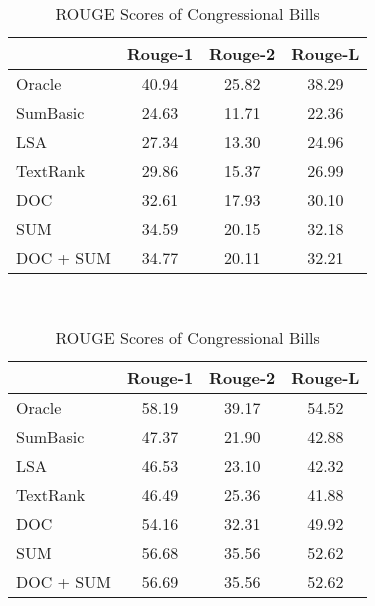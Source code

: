 \documentclass[11pt,a4paper]{article}
\begin{document}
\begin{table}[h]
\caption{ROUGE Scores of Congressional Bills}\label{tab:rouge}
    \begin{tabular}{|l|c|c|c|}
    \hline
         &  Rouge-1 & Rouge-2 & Rouge-L \\ \hline
         Oracle & 40.94  & 25.82 & 38.29 \\
        \hline
        SumBasic &  24.63 &	11.71 &	22.36\\ 
        LSA &  27.34 &	13.30 &	24.96\\ 
        TextRank &  29.86 &	15.37 &	26.99\\ 
        \hline 
        DOC & 32.61 & 17.93  & 30.10 \\
        SUM &  34.59 & 20.15 & 32.18\\ 
        DOC + SUM &  34.77 & 20.11 & 32.21\\ 
    
        \hline
    \end{tabular}\\
    \bigskip
    \begin{tabular}{|l|c|c|c|}
        \hline
         &  Rouge-1 & Rouge-2 & Rouge-L \\ \hline
         Oracle & 58.19  & 39.17 & 54.52 \\
        \hline
        SumBasic &  47.37 &	21.90 &	42.88\\ 
        LSA &  46.53 & 23.10 &	42.32 \\ 
        TextRank &  46.49	& 25.36 &	41.88 \\ 
        \hline 
        DOC & 54.16 & 32.31 & 49.92 \\
        SUM &  56.68 & 35.56 & 52.62 \\ 
        DOC + SUM &  56.69 & 35.56 & 52.62\\ 
        \hline
    \end{tabular}\\
\end{table}
\end{document}

